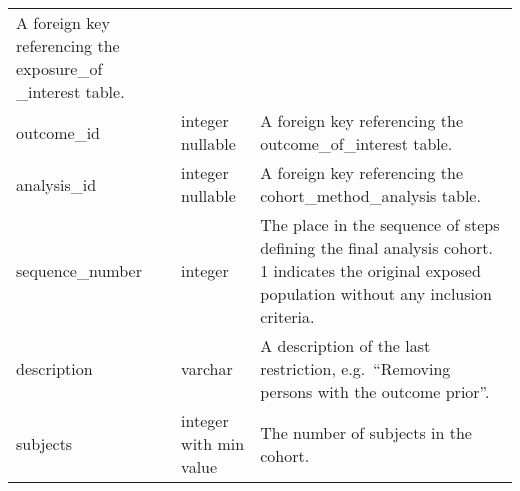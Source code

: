 \documentclass[
]{article}
\begin{document}
\begin{longtable}[]{@{}lll@{}}
\begin{minipage}[t]{0.50\columnwidth}
A foreign key referencing the exposure\_of \_interest table.\strut
\end{minipage}\tabularnewline
\begin{minipage}[t]{0.23\columnwidth}\raggedright
outcome\_id\strut
\end{minipage} & \begin{minipage}[t]{0.18\columnwidth}\raggedright
integer nullable\strut
\end{minipage} & \begin{minipage}[t]{0.50\columnwidth}\raggedright
A foreign key referencing the outcome\_of\_interest table.\strut
\end{minipage}\tabularnewline
\begin{minipage}[t]{0.23\columnwidth}\raggedright
analysis\_id\strut
\end{minipage} & \begin{minipage}[t]{0.18\columnwidth}\raggedright
integer nullable\strut
\end{minipage} & \begin{minipage}[t]{0.50\columnwidth}\raggedright
A foreign key referencing the cohort\_method\_analysis table.\strut
\end{minipage}\tabularnewline
\begin{minipage}[t]{0.23\columnwidth}\raggedright
sequence\_number\strut
\end{minipage} & \begin{minipage}[t]{0.18\columnwidth}\raggedright
integer\strut
\end{minipage} & \begin{minipage}[t]{0.50\columnwidth}\raggedright
The place in the sequence of steps defining the final analysis cohort. 1
indicates the original exposed population without any inclusion
criteria.\strut
\end{minipage}\tabularnewline
\begin{minipage}[t]{0.23\columnwidth}\raggedright
description\strut
\end{minipage} & \begin{minipage}[t]{0.18\columnwidth}\raggedright
varchar\strut
\end{minipage} & \begin{minipage}[t]{0.50\columnwidth}\raggedright
A description of the last restriction, e.g.~``Removing persons with the
outcome prior''.\strut
\end{minipage}\tabularnewline
\begin{minipage}[t]{0.23\columnwidth}\raggedright
subjects\strut
\end{minipage} & \begin{minipage}[t]{0.18\columnwidth}\raggedright
integer with min value\strut
\end{minipage} & \begin{minipage}[t]{0.50\columnwidth}\raggedright
The number of subjects in the cohort.\strut
\end{minipage}\tabularnewline
\bottomrule
\end{longtable}
\end{document}
